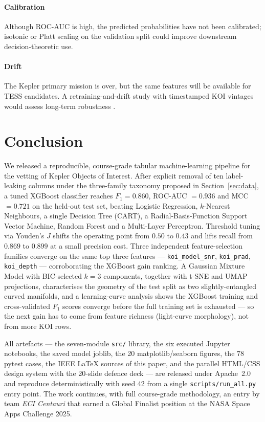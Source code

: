 \documentclass[conference]{IEEEtran}
\begin{document}
\paragraph*{Calibration} Although ROC-AUC is high, the predicted
probabilities have not been calibrated; isotonic or Platt scaling on
the validation split could improve downstream decision-theoretic use.

\paragraph*{Drift} The Kepler primary mission is over, but the same
features will be available for TESS candidates. A retraining-and-drift
study with timestamped KOI vintages would assess long-term robustness
\cite{helli2024drift}.

\section{Conclusion}\label{sec:conclusion}

We released a reproducible, course-grade tabular machine-learning
pipeline for the vetting of Kepler Objects of Interest. After
explicit removal of ten label-leaking columns under the
three-family taxonomy proposed in Section~\ref{sec:data}, a tuned
XGBoost classifier reaches $F_1 = 0.860$, ROC-AUC $= 0.936$ and
MCC $= 0.721$ on the held-out test set, beating Logistic
Regression, $k$-Nearest Neighbours, a single Decision Tree (CART),
a Radial-Basis-Function Support Vector Machine, Random Forest and
a Multi-Layer Perceptron. Threshold tuning via Youden's $J$
shifts the operating point from $0.50$ to $0.43$ and lifts recall
from $0.869$ to $0.899$ at a small precision cost. Three
independent feature-selection families converge on the same top
three features --- \texttt{koi\_model\_snr}, \texttt{koi\_prad},
\texttt{koi\_depth} --- corroborating the XGBoost gain ranking.
A Gaussian Mixture Model with BIC-selected $k = 3$ components,
together with t-SNE and UMAP projections, characterises the
geometry of the test split as two slightly-entangled curved
manifolds, and a learning-curve analysis shows the XGBoost
training and cross-validated $F_1$ scores converge before the
full training set is exhausted --- so the next gain has to come
from feature richness (light-curve morphology), not from more
KOI rows.

All artefacts --- the seven-module \texttt{src/} library, the six
executed Jupyter notebooks, the saved model joblib, the 20
matplotlib/seaborn figures, the $78$ pytest cases, the IEEE LaTeX
sources of this paper, and the parallel HTML/CSS design system
with the 20-slide defence deck --- are released under Apache~2.0
and reproduce deterministically with seed 42 from a single
\texttt{scripts/run\_all.py} entry point. The work continues,
with full course-grade methodology, an entry by team \emph{ECI
Centauri} that earned a Global Finalist position at the NASA
Space Apps Challenge 2025.
\end{document}
